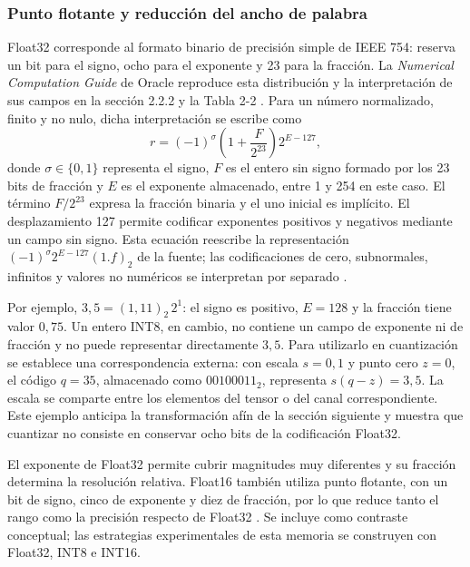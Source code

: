 \subsubsection{Punto flotante y reducción del ancho de palabra}
Float32 corresponde al formato binario de precisión simple de IEEE 754: reserva un bit para el signo, ocho para el exponente y 23 para la fracción. La \textit{Numerical Computation Guide} de Oracle reproduce esta distribución y la interpretación de sus campos en la sección 2.2.2 y la Tabla 2-2 \cite{oracleieee}. Para un número normalizado, finito y no nulo, dicha interpretación se escribe como
\begin{equation}
r=(-1)^{\sigma}\left(1+\frac{F}{2^{23}}\right)2^{E-127},
\label{eq:cap3_float32}
\end{equation}
donde $\sigma\in\{0,1\}$ representa el signo, $F$ es el entero sin signo formado por los 23 bits de fracción y $E$ es el exponente almacenado, entre 1 y 254 en este caso. El término $F/2^{23}$ expresa la fracción binaria y el uno inicial es implícito. El desplazamiento 127 permite codificar exponentes positivos y negativos mediante un campo sin signo. Esta ecuación reescribe la representación $(-1)^{\sigma}2^{E-127}(1.f)_2$ de la fuente; las codificaciones de cero, subnormales, infinitos y valores no numéricos se interpretan por separado \cite{oracleieee}.

Por ejemplo, $3{,}5=(1{,}11)_2\,2^1$: el signo es positivo, $E=128$ y la fracción tiene valor $0{,}75$. Un entero INT8, en cambio, no contiene un campo de exponente ni de fracción y no puede representar directamente $3{,}5$. Para utilizarlo en cuantización se establece una correspondencia externa: con escala $s=0{,}1$ y punto cero $z=0$, el código $q=35$, almacenado como $00100011_2$, representa $s(q-z)=3{,}5$. La escala se comparte entre los elementos del tensor o del canal correspondiente. Este ejemplo anticipa la transformación afín de la sección siguiente y muestra que cuantizar no consiste en conservar ocho bits de la codificación Float32.

El exponente de Float32 permite cubrir magnitudes muy diferentes y su fracción determina la resolución relativa. Float16 también utiliza punto flotante, con un bit de signo, cinco de exponente y diez de fracción, por lo que reduce tanto el rango como la precisión respecto de Float32 \cite{oraclefloat16}. Se incluye como contraste conceptual; las estrategias experimentales de esta memoria se construyen con Float32, INT8 e INT16.

